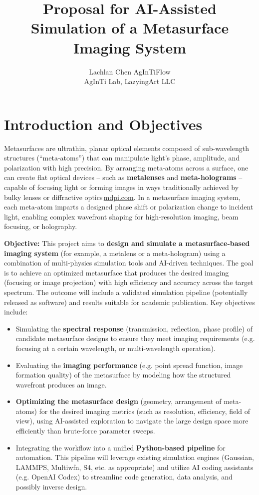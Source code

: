 \documentclass[11pt]{article}
\title{Proposal for AI-Assisted Simulation of a Metasurface Imaging System}
\author{\begin{tabular}{c}Lachlan Chen \quad AgInTiFlow\\AgInTi Lab, LazyingArt LLC\end{tabular}}
\date{}
\begin{document}
\maketitle

\section{Introduction and Objectives}

Metasurfaces are ultrathin, planar optical elements composed of sub-wavelength structures (``meta-atoms'') that can manipulate light's phase, amplitude, and polarization with high precision. By arranging meta-atoms across a surface, one can create flat optical devices -- such as \textbf{metalenses} and \textbf{meta-holograms} -- capable of focusing light or forming images in ways traditionally achieved by bulky lenses or diffractive optics\,\href{https://www.mdpi.com/2304-6732/12/10/947#:~:text=holographic%20imaging%20enables%20rapid%20metasurface,focusing%2C%20beam%20shaping%2C%20and%20aberration}{mdpi.com}. In a metasurface imaging system, each meta-atom imparts a designed phase shift or polarization change to incident light, enabling complex wavefront shaping for high-resolution imaging, beam focusing, or holography.

\textbf{Objective:} This project aims to \textbf{design and simulate a metasurface-based imaging system} (for example, a metalens or a meta-hologram) using a combination of multi-physics simulation tools and AI-driven techniques. The goal is to achieve an optimized metasurface that produces the desired imaging (focusing or image projection) with high efficiency and accuracy across the target spectrum. The outcome will include a validated simulation pipeline (potentially released as software) and results suitable for academic publication. Key objectives include:

\begin{itemize}
  \item Simulating the \textbf{spectral response} (transmission, reflection, phase profile) of candidate metasurface designs to ensure they meet imaging requirements (e.g. focusing at a certain wavelength, or multi-wavelength operation).
  \item Evaluating the \textbf{imaging performance} (e.g. point spread function, image formation quality) of the metasurface by modeling how the structured wavefront produces an image.
  \item \textbf{Optimizing the metasurface design} (geometry, arrangement of meta-atoms) for the desired imaging metrics (such as resolution, efficiency, field of view), using AI-assisted exploration to navigate the large design space more efficiently than brute-force parameter sweeps.
  \item Integrating the workflow into a unified \textbf{Python-based pipeline} for automation. This pipeline will leverage existing simulation engines (Gaussian, LAMMPS, Multiwfn, S4, etc. as appropriate) and utilize AI coding assistants (e.g. OpenAI Codex) to streamline code generation, data analysis, and possibly inverse design.
\end{itemize}
\end{document}
